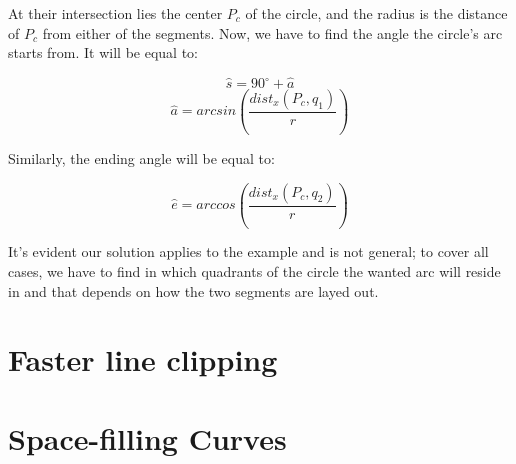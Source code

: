 \documentclass[12pt,openany,a4,usenames,dvipsnames]{book}
\begin{document}
\noindent{}At their intersection lies the center $P_c$ of the circle, and the radius is the distance of $P_c$ from either of the segments. Now, we have to find the angle the circle's arc starts from. It will be equal to:

$$\hat{s} = 90^{\circ} + \hat{a}$$
$$\hat{a} = arcsin(\frac{dist_x(P_c, q_1)}{r})$$

\noindent{}Similarly, the ending angle \textbf{\textcolor{white}{\cm{}\LARGE{}}} will be equal to:

$$\hat{e} = arccos(\frac{dist_x(P_c, q_2)}{r})$$

\noindent{}It's evident our solution applies to the example and is not general; to cover all cases, we have to find in which quadrants of the circle the wanted arc will reside in and that depends on how the two segments are layed out.

\chapter{Faster line clipping}
\skelpar%
\chapter{Space-filling Curves}
\skelpar%
\clearpage{}
\end{document}

